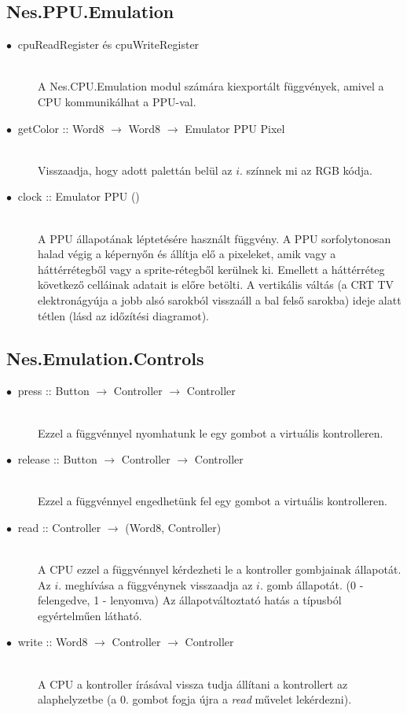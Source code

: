 \subsection{Nes.PPU.Emulation}

\begin{description}
	\item[$\bullet\:$ cpuReadRegister és cpuWriteRegister] \hfill \\
	A Nes.CPU.Emulation modul számára kiexportált függvények, amivel a CPU kommunikálhat a PPU-val.
	\item[$\bullet\:$ getColor :: Word8 $\rightarrow$ Word8 $\rightarrow$ Emulator PPU Pixel] \hfill \\
	Visszaadja, hogy adott palettán belül az $i.$ színnek mi az RGB kódja. 
	\item[$\bullet\:$ clock :: Emulator PPU ()] \hfill \\
	A PPU állapotának léptetésére használt függvény. A PPU sorfolytonosan halad végig a képernyőn és állítja elő a pixeleket, amik vagy a háttérrétegből vagy a sprite-rétegből kerülnek ki. Emellett a háttérréteg következő celláinak adatait is előre  betölti.
	A vertikális váltás (a CRT TV elektronágyúja a jobb alsó sarokból visszaáll a bal felső sarokba) ideje alatt tétlen (lásd az időzítési diagramot).
\end{description}

\subsection{Nes.Emulation.Controls}

\begin{description}
	\item[$\bullet\:$ press :: Button $\rightarrow$ Controller $\rightarrow$ Controller] \hfill \\
	Ezzel a függvénnyel nyomhatunk le egy gombot a virtuális kontrolleren.
	\item[$\bullet\:$ release :: Button $\rightarrow$ Controller $\rightarrow$ Controller] \hfill \\
	Ezzel a függvénnyel engedhetünk fel egy gombot a virtuális kontrolleren.
	\item[$\bullet\:$ read :: Controller $\rightarrow$ (Word8, Controller)] \hfill \\
		A CPU ezzel a függvénnyel kérdezheti le a kontroller gombjainak állapotát.
		Az $i.$ meghívása a függvénynek visszaadja az $i.$ gomb állapotát. (0 - felengedve, 1 - lenyomva) Az állapotváltoztató hatás a típusból egyértelműen látható.
	\item[$\bullet\:$ write :: Word8 $\rightarrow$ Controller $\rightarrow$ Controller] \hfill \\
		A CPU a kontroller írásával vissza tudja állítani a kontrollert az alaphelyzetbe (a 0. gombot fogja újra a \emph{read} művelet lekérdezni).
	
\end{description}

